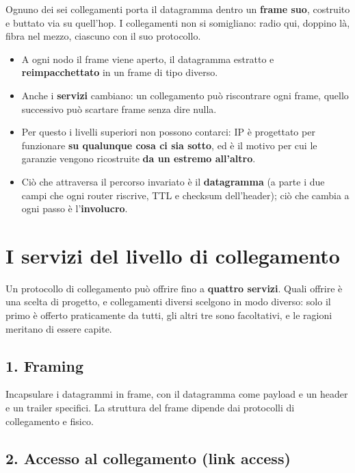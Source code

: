 Ognuno dei sei collegamenti porta il datagramma dentro un \textbf{frame suo}, costruito e buttato via su quell'hop. I collegamenti
non si somigliano: radio qui, doppino là, fibra nel mezzo, ciascuno con il suo protocollo.

\begin{itemize}
    \item A ogni nodo il frame viene aperto, il datagramma estratto e \textbf{reimpacchettato} in un frame di tipo diverso.
    \item Anche i \textbf{servizi} cambiano: un collegamento può riscontrare ogni frame, quello successivo può scartare frame senza
          dire nulla.
    \item Per questo i livelli superiori non possono contarci: IP è progettato per funzionare \textbf{su qualunque cosa ci sia sotto},
          ed è il motivo per cui le garanzie vengono ricostruite \textbf{da un estremo all'altro}.
    \item Ciò che attraversa il percorso invariato è il \textbf{datagramma} (a parte i due campi che ogni router riscrive, TTL e
          checksum dell'header); ciò che cambia a ogni passo è l'\textbf{involucro}.
\end{itemize}

\section{I servizi del livello di collegamento}

Un protocollo di collegamento può offrire fino a \textbf{quattro servizi}. Quali offrire è una scelta di progetto, e collegamenti
diversi scelgono in modo diverso: solo il primo è offerto praticamente da tutti, gli altri tre sono facoltativi, e le ragioni
meritano di essere capite.

\subsection{1. Framing}

Incapsulare i datagrammi in frame, con il datagramma come payload e un header e un trailer specifici. La struttura del frame dipende
dai protocolli di collegamento e fisico.

\subsection{2. Accesso al collegamento (link access)}

